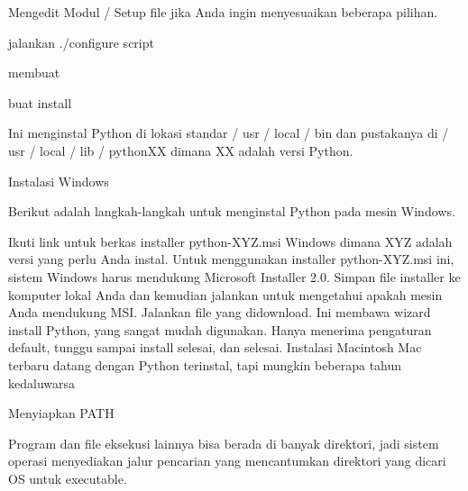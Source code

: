 \vspace{14pt}
\noindent 
{\fontsize{14pt}{14pt}\selectfont Mengedit Modul / Setup file jika Anda ingin menyesuaikan beberapa pilihan. \\} \par
\vspace{14pt}
\noindent 
{\fontsize{14pt}{14pt}\selectfont jalankan ./configure script \\} \par
\vspace{14pt}
\noindent 
{\fontsize{14pt}{14pt}\selectfont membuat \\} \par
\vspace{14pt}
\noindent 
{\fontsize{14pt}{14pt}\selectfont buat install \\} \par
\vspace{14pt}
\noindent 
{\fontsize{14pt}{14pt}\selectfont Ini menginstal Python di lokasi standar / usr / local / bin dan pustakanya di / usr / local / lib / pythonXX dimana XX adalah versi Python. \\} \par
\vspace{14pt}
\noindent 
{\fontsize{14pt}{14pt}\selectfont Instalasi Windows \\} \par
\noindent 
{\fontsize{14pt}{14pt}\selectfont Berikut adalah langkah-langkah untuk menginstal Python pada mesin Windows. \\} \par
\noindent 
{\fontsize{14pt}{14pt}\selectfont \vspace{\baselineskip}
Ikuti link untuk berkas installer python-XYZ.msi Windows dimana XYZ adalah versi yang perlu Anda instal. Untuk menggunakan installer python-XYZ.msi ini, sistem Windows harus mendukung Microsoft Installer 2.0. Simpan file installer ke komputer lokal Anda dan kemudian jalankan untuk mengetahui apakah mesin Anda mendukung MSI. Jalankan file yang didownload. Ini membawa wizard install Python, yang sangat mudah digunakan. Hanya menerima pengaturan default, tunggu sampai install selesai, dan selesai. Instalasi Macintosh Mac terbaru datang dengan Python terinstal, tapi mungkin beberapa tahun kedaluwarsa \\} \par
\noindent 
{\fontsize{14pt}{14pt}\selectfont Menyiapkan PATH \\} \par
\noindent 
{\fontsize{14pt}{14pt}\selectfont Program dan file eksekusi lainnya bisa berada di banyak direktori, jadi sistem operasi menyediakan jalur pencarian yang mencantumkan direktori yang dicari OS untuk executable. \\} \par
